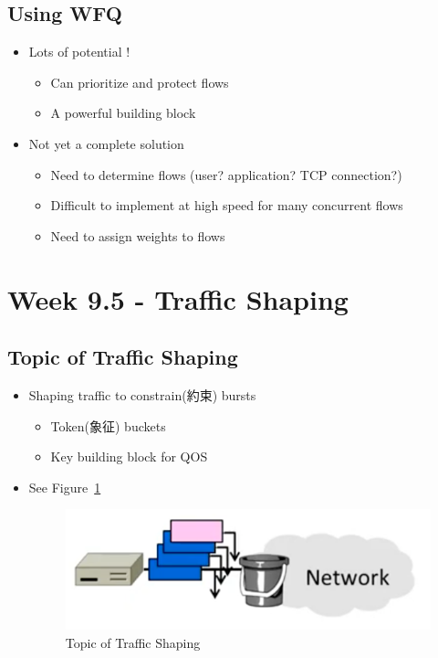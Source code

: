 \documentclass[12pt]{ctexart}   %
\begin{document}
	\subsection{Using WFQ}
	\begin{itemize}
		\item Lots of potential !
		\begin{itemize}
			\item Can prioritize and protect flows
			\item A powerful building block
		\end{itemize}
		
		\item Not yet a complete solution
		\begin{itemize}
			\item Need to determine flows (user? application? TCP connection?)
			\item Difficult to implement at high speed for many concurrent flows
			\item Need to assign weights to flows
		\end{itemize}
	\end{itemize}
	
\section{Week 9.5 - Traffic Shaping}
	\subsection{Topic of Traffic Shaping}
	\begin{itemize}
		\item Shaping traffic to constrain(約束) bursts
		\begin{itemize}
			\item Token(象征) buckets
			\item Key building block for QOS
		\end{itemize}
		\item See Figure~\ref{fig:9-5-1}
		  
		 \begin{figure}[h!] %
		\centering
		 \includegraphics[scale=0.7]{images/9-5-1}
		\caption{ Topic of Traffic Shaping }
		 \label{fig:9-5-1}
		 \end{figure}
	\end{itemize}
	
\end{document}
